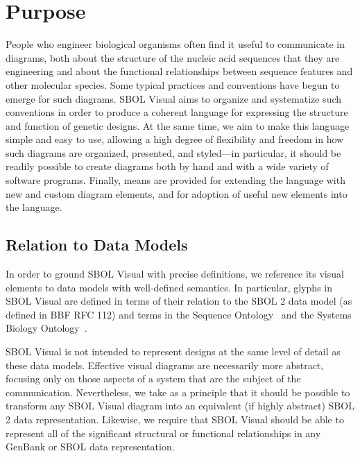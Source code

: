 \section{Purpose}

People who engineer biological organisms often find it useful to communicate in
diagrams, both about the structure of the nucleic acid sequences that they are engineering 
and about the functional relationships between sequence features and other molecular species.
%
Some typical practices and conventions have begun to emerge for such
diagrams.  SBOL Visual aims to organize and systematize such
conventions in order to produce a coherent language for expressing
the structure and function 
of genetic designs. 
%
At the same time, we aim to make this language simple and easy to use,
allowing a high degree of flexibility and freedom in how such diagrams are organized, presented, and
styled---in particular, it should be readily possible to create
diagrams both by hand and with a wide variety of software programs.
%
Finally, means are provided for extending the language with new and
custom diagram elements, and for adoption of useful new elements into
the language.

\subsection{Relation to Data Models}

In order to ground SBOL Visual with precise definitions, we reference its visual elements to data models with well-defined semantics.
In particular, glyphs in SBOL Visual are defined in terms of their relation to the SBOL 2 data model (as defined in BBF RFC 112) and terms in the Sequence Ontology~\citep{SequenceOntology} and
the Systems Biology Ontology~\citep{SBO}.

SBOL Visual is not intended to represent designs at the same level of detail as these data models.
Effective visual diagrams are necessarily more abstract, focusing only on those aspects of a system that are the subject of the communication.
Nevertheless, we take as a principle that it should be possible to transform any SBOL Visual diagram into an equivalent (if highly abstract) SBOL 2 data representation.
Likewise, we require that SBOL Visual should be able to represent all of the significant structural or functional relationships in any GenBank or SBOL data representation.

